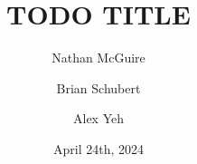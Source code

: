 \documentclass[12pt,letterpaper]{article} %
\title{\bfseries{} TODO TITLE}
\author{
    Nathan McGuire \\ \FancyEmail{mcguire.n@northeastern.edu} \and
    Brian Schubert \\ \FancyEmail{schubert.b@northeastern.edu}\and
    Alex Yeh \\ \FancyEmail{yeh.al@northeastern.edu}
}
\date{April 24th, 2024}
\begin{document}
\maketitle

\lipsum[0-3]

\nocite{9229407}
\nocite{DVN/CU4UXG_2021}
\nocite{Olsson}
\nocite{shrestha2022real}

\clearpage
\printbibliography
\end{document}
